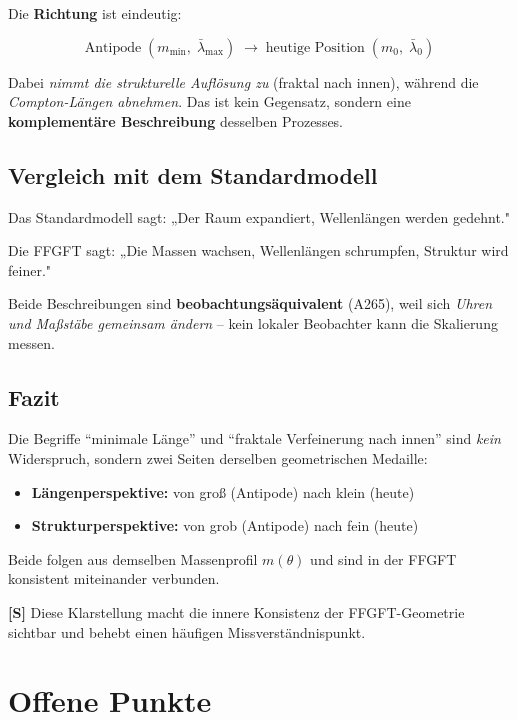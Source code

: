 Die \textbf{Richtung} ist eindeutig:

\[
\text{Antipode} \;(m_\text{min},\; \bar\lambda_\text{max})
\;\longrightarrow\;
\text{heutige Position} \;(m_0,\; \bar\lambda_0)
\]

Dabei \emph{nimmt die strukturelle Auflösung zu} (fraktal nach innen),
während die \emph{Compton-Längen abnehmen}. Das ist kein Gegensatz,
sondern eine \textbf{komplementäre Beschreibung} desselben Prozesses.

\subsection{Vergleich mit dem Standardmodell}

Das Standardmodell sagt:  
„Der Raum expandiert, Wellenlängen werden gedehnt."

Die FFGFT sagt:  
„Die Massen wachsen, Wellenlängen schrumpfen, Struktur wird feiner."

Beide Beschreibungen sind \textbf{beobachtungsäquivalent} (A265),
weil sich \emph{Uhren und Maßstäbe gemeinsam ändern} – kein lokaler
Beobachter kann die Skalierung messen.

\subsection{Fazit}

Die Begriffe \enquote{minimale Länge} und \enquote{fraktale Verfeinerung
	nach innen} sind \emph{kein} Widerspruch, sondern zwei Seiten derselben
geometrischen Medaille:

\begin{itemize}[leftmargin=1.4em,itemsep=0.2em]
	\item \textbf{Längenperspektive:} von groß (Antipode) nach klein (heute)
	\item \textbf{Strukturperspektive:} von grob (Antipode) nach fein (heute)
\end{itemize}

Beide folgen aus demselben Massenprofil $m(\theta)$ und sind in der
FFGFT konsistent miteinander verbunden.

\textbf{[S]} Diese Klarstellung macht die innere Konsistenz der
FFGFT-Geometrie sichtbar und behebt einen häufigen Missverständnispunkt.

\section{Offene Punkte}

